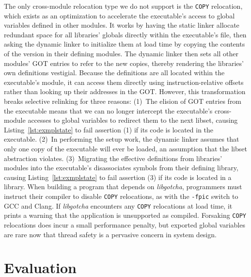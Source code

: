 The only cross-module relocation type we do not support is the \texttt{COPY}
relocation, which exists as an optimization to accelerate the executable's access to
global variables defined in other modules.  It works by having the static linker
allocate redundant space for all libraries' globals directly within the executable's
file, then asking the dynamic linker to initialize them at load time by copying the
contents of the version in their defining modules.  The dynamic linker then sets all
other modules' GOT entries to refer to the new copies, thereby rendering the
libraries' own definitions vestigial.  Because the definitions are all located within
the executable's module, it can access them directly using instruction-relative
offsets rather than looking up their addresses in the GOT.  However, this
transformation breaks selective relinking for three reasons:  (1)~The elision of
GOT entries from the executable means that we can no longer intercept the
executable's cross-module accesses to global variables to redirect them to the next
libset, causing Listing~\ref{lst:exmplstate} to fail assertion (1) if its code is
located in the executable.  (2)~In performing the setup work, the dynamic linker
assumes that only one copy of the executable will ever be loaded, an assumption that
the libset abstraction violates.  (3)~Migrating the effective definitions from
libraries' modules into the executable's disassociates symbols from their defining
library, causing Listing~\ref{lst:exmplstate} to fail assertion (3) if its code is
located in a library.  When building a program that depends on \textit{libgotcha},
programmers must instruct their compiler to disable \texttt{COPY} relocations, as
with the \texttt{-fpic} switch to GCC and Clang.  If \textit{libgotcha} encounters
any \texttt{COPY} relocations at load time, it prints a warning that the application
is unsupported as compiled.  Forsaking \texttt{COPY} relocations does incur a small
performance penalty, but exported global variables are rare now that thread safety
is a pervasive concern in system design.


\section{Evaluation}






